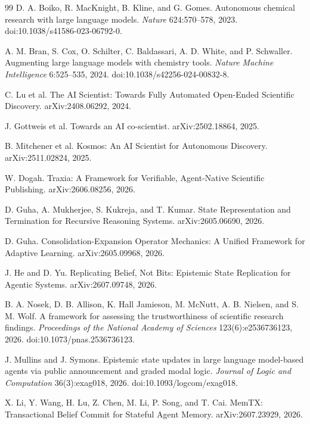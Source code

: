 \documentclass[11pt]{article}
\begin{document}
\begin{thebibliography}{99}
\small
{} D. A. Boiko, R. MacKnight, B. Kline, and G. Gomes. Autonomous chemical research with large language models. \emph{Nature} 624:570--578, 2023. doi:10.1038/s41586-023-06792-0.

 A. M. Bran, S. Cox, O. Schilter, C. Baldassari, A. D. White, and P. Schwaller. Augmenting large language models with chemistry tools. \emph{Nature Machine Intelligence} 6:525--535, 2024. doi:10.1038/s42256-024-00832-8.

 C. Lu et al. The AI Scientist: Towards Fully Automated Open-Ended Scientific Discovery. arXiv:2408.06292, 2024.

 J. Gottweis et al. Towards an AI co-scientist. arXiv:2502.18864, 2025.

 B. Mitchener et al. Kosmos: An AI Scientist for Autonomous Discovery. arXiv:2511.02824, 2025.

 W. Dogah. Traxia: A Framework for Verifiable, Agent-Native Scientific Publishing. arXiv:2606.08256, 2026.

 D. Guha, A. Mukherjee, S. Kukreja, and T. Kumar. State Representation and Termination for Recursive Reasoning Systems. arXiv:2605.06690, 2026.

 D. Guha. Consolidation-Expansion Operator Mechanics: A Unified Framework for Adaptive Learning. arXiv:2605.09968, 2026.

 J. He and D. Yu. Replicating Belief, Not Bits: Epistemic State Replication for Agentic Systems. arXiv:2607.09748, 2026.

 B. A. Nosek, D. B. Allison, K. Hall Jamieson, M. McNutt, A. B. Nielsen, and S. M. Wolf. A framework for assessing the trustworthiness of scientific research findings. \emph{Proceedings of the National Academy of Sciences} 123(6):e2536736123, 2026. doi:10.1073/pnas.2536736123.

 J. Mullins and J. Symons. Epistemic state updates in large language model-based agents via public announcement and graded modal logic. \emph{Journal of Logic and Computation} 36(3):exag018, 2026. doi:10.1093/logcom/exag018.

 X. Li, Y. Wang, H. Lu, Z. Chen, M. Li, P. Song, and T. Cai. MemTX: Transactional Belief Commit for Stateful Agent Memory. arXiv:2607.23929, 2026.


\end{thebibliography}
\end{document}
